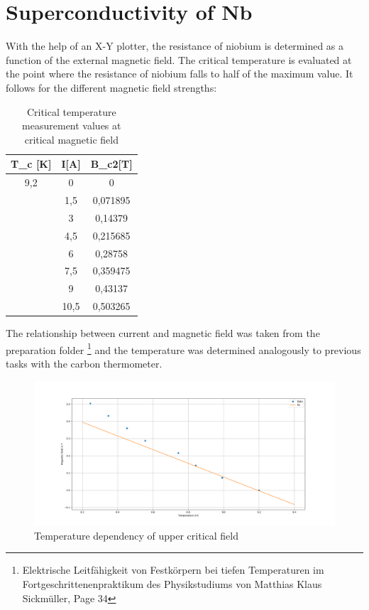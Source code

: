 

\section{Superconductivity of Nb}

With the help of an X-Y plotter, the resistance of niobium is determined as a function of the external magnetic field. The critical temperature is evaluated at the point where the resistance of niobium falls to half of the maximum value. It follows for the different magnetic field strengths:
\begin{table}[]
    \centering
    \caption{Critical temperature measurement values at critical magnetic field}
    \begin{tabular}{c|c|c}
         T_c [K]&I[A]&B_{c2}[T]  \\
         \hline
         9,2& 0&0\\
         &1,5&0,071895 \\
         &3&0,14379 \\
         &4,5&0,215685\\
         &6&0,28758 \\
         &7,5&0,359475 \\
         &9&0,43137 \\
         &10,5&0,503265 \\
    \end{tabular}
    \label{tab:Niob_critical}
\end{table}

The relationship between current and magnetic field was taken from the preparation folder
\footnote{Elektrische Leitfähigkeit von Festkörpern bei tiefen Temperaturen im Fortgeschrittenenpraktikum des Physikstudiums von Matthias Klaus Sickmüller, Page 34}
and the temperature was determined analogously to previous tasks with the carbon thermometer. 
\begin{figure}
    \centering
    \includegraphics{./fig/ex3.png}
    \caption{Temperature dependency of upper critical field}
    \label{fig:ex3}
\end{figure}

